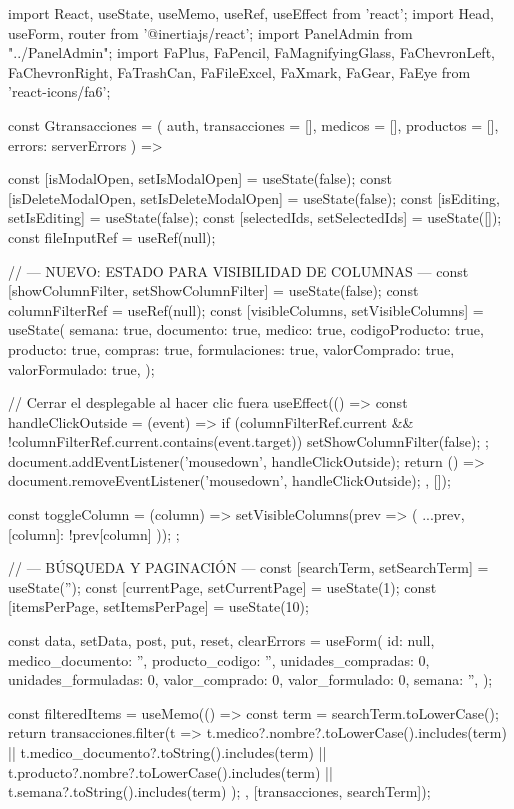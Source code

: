 import React, { useState, useMemo, useRef, useEffect } from 'react';
import { Head, useForm, router } from '@inertiajs/react';
import PanelAdmin from "../PanelAdmin";
import {
    FaPlus, FaPencil, FaMagnifyingGlass, FaChevronLeft, FaChevronRight, FaTrashCan,
    FaFileExcel, FaXmark, FaGear, FaEye
} from 'react-icons/fa6';

const Gtransacciones = ({ auth, transacciones = [], medicos = [], productos = [], errors: serverErrors }) => {
    const [isModalOpen, setIsModalOpen] = useState(false);
    const [isDeleteModalOpen, setIsDeleteModalOpen] = useState(false);
    const [isEditing, setIsEditing] = useState(false);
    const [selectedIds, setSelectedIds] = useState([]);
    const fileInputRef = useRef(null);

    // --- NUEVO: ESTADO PARA VISIBILIDAD DE COLUMNAS ---
    const [showColumnFilter, setShowColumnFilter] = useState(false);
    const columnFilterRef = useRef(null);
    const [visibleColumns, setVisibleColumns] = useState({
        semana: true,
        documento: true,
        medico: true,
        codigoProducto: true,
        producto: true,
        compras: true,
        formulaciones: true,
        valorComprado: true,
        valorFormulado: true,
    });

    // Cerrar el desplegable al hacer clic fuera
    useEffect(() => {
        const handleClickOutside = (event) => {
            if (columnFilterRef.current && !columnFilterRef.current.contains(event.target)) {
                setShowColumnFilter(false);
            }
        };
        document.addEventListener('mousedown', handleClickOutside);
        return () => document.removeEventListener('mousedown', handleClickOutside);
    }, []);

    const toggleColumn = (column) => {
        setVisibleColumns(prev => ({ ...prev, [column]: !prev[column] }));
    };

    // --- BÚSQUEDA Y PAGINACIÓN ---
    const [searchTerm, setSearchTerm] = useState('');
    const [currentPage, setCurrentPage] = useState(1);
    const [itemsPerPage, setItemsPerPage] = useState(10);

    const { data, setData, post, put, reset, clearErrors } = useForm({
        id: null, medico_documento: '', producto_codigo: '', unidades_compradas: 0,
        unidades_formuladas: 0, valor_comprado: 0, valor_formulado: 0, semana: '',
    });

    const filteredItems = useMemo(() => {
        const term = searchTerm.toLowerCase();
        return transacciones.filter(t =>
            t.medico?.nombre?.toLowerCase().includes(term) ||
            t.medico_documento?.toString().includes(term) ||
            t.producto?.nombre?.toLowerCase().includes(term) ||
            t.semana?.toString().includes(term)
        );
    }, [transacciones, searchTerm]);

}
